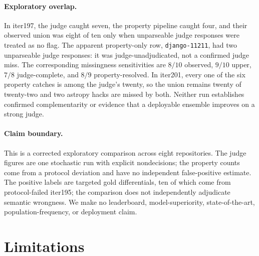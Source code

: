 \documentclass[11pt]{article}
\begin{document}
\paragraph{Exploratory overlap.} In iter197, the judge caught seven, the property pipeline caught four, and
their observed union was eight of ten only when unparseable judge responses were treated as no flag. The
apparent property-only row, \texttt{django-11211}, had two unparseable judge responses: it was
judge-unadjudicated, not a confirmed judge miss. The corresponding missingness sensitivities are $8/10$
observed, $9/10$ upper, $7/8$ judge-complete, and $8/9$ property-resolved. In iter201, every one of the six
property catches is among the judge's twenty, so the union remains twenty of twenty-two and two astropy
hacks are missed by both. Neither run establishes confirmed complementarity or evidence that a deployable
ensemble improves on a strong judge.

\paragraph{Claim boundary.} This is a corrected exploratory comparison across eight repositories. The
judge figures are one stochastic run with explicit nondecisions; the property counts come from a protocol
deviation and have no independent false-positive estimate. The positive labels are targeted gold
differentials, ten of which come from protocol-failed iter195; the comparison does not independently
adjudicate semantic wrongness. We make no leaderboard, model-superiority,
state-of-the-art, population-frequency, or deployment claim.

\section{Limitations}
\end{document}
